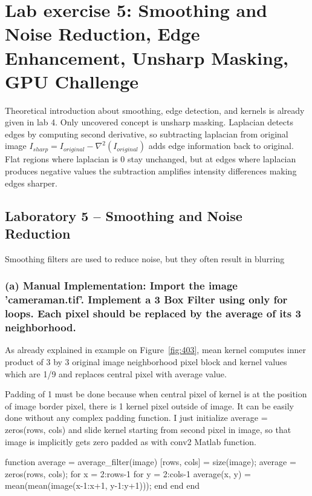 \clearpage
\section{Lab exercise 5: Smoothing and Noise Reduction, Edge Enhancement, Unsharp Masking, GPU Challenge}

Theoretical introduction about smoothing, edge detection, and kernels is already given in lab 4. Only uncovered concept is unsharp masking. Laplacian detects edges by computing second derivative, so subtracting laplacian from original image $I_{sharp} = I_{original} - \nabla^2(I_{original})$ adds edge information back to original. Flat regions where laplacian is 0 stay unchanged, but at edges where laplacian produces negative values the subtraction amplifies intensity differences making edges sharper.

\subsection{Laboratory 5 -- Smoothing and Noise Reduction}

Smoothing filters are used to reduce noise, but they often result in blurring

\subsubsection{(a) Manual Implementation: Import the image 'cameraman.tif'. Implement a 3 Box Filter using only for loops. Each pixel should be replaced by the average of its 3 neighborhood.}

As already explained in example on Figure~\ref{fig:403}, mean kernel computes inner product of 3 by 3 original image neighborhood pixel block and kernel values which are 1/9 and replaces central pixel with average value.  

Padding of 1 must be done because when central pixel of kernel is at the position of image border pixel, there is 1 kernel pixel outside of image. It can be easily done without any complex padding function. I just initialize average = zeros(rows, cols) and slide kernel starting from second pixel in image, so that image is implicitly gets zero padded as with conv2 Matlab function.

\codeused
\begin{matlab}
function average = average_filter(image)
    [rows, cols] = size(image);
    average = zeros(rows, cols);
    for x = 2:rows-1
        for y = 2:cols-1
            average(x, y) = mean(mean(image(x-1:x+1, y-1:y+1)));
        end
    end
end
\end{matlab}

